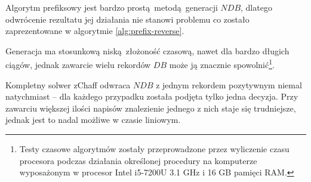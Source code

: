 Algorytm prefiksowy jest bardzo prostą metodą generacji $NDB$, dlatego odwrócenie rezultatu jej działania nie stanowi problemu co zostało zaprezentowane w algorytmie \ref{alg:prefix-reverse}.

Generacja ma stosunkową niską złożoność czasową, nawet dla bardzo długich ciągów, jednak zawarcie wielu rekordów $DB$ może ją znacznie spowolnić\footnote{Testy czasowe algorytmów zostały przeprowadzone przez wyliczenie czasu procesora podczas działania określonej procedury na komputerze wyposażonym w procesor Intel i5-7200U 3.1 GHz i 16 GB pamięci RAM.}.
 
Kompletny solwer zChaff odwraca $NDB$ z jednym rekordem pozytywnym niemal natychmiast -- dla każdego przypadku została podjęta tylko jedna decyzja.
Przy zawarciu większej ilości napisów znalezienie jednego z nich staje się trudniejsze, jednak jest to nadal możliwe w czasie liniowym.

